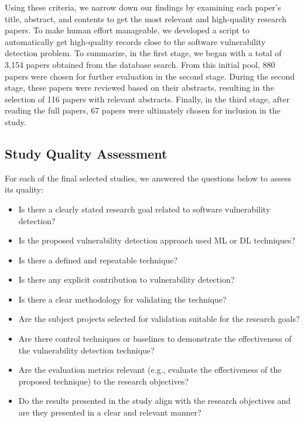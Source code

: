 {Using these criteria, we narrow down our findings by examining each paper's title, abstract, and contents to get the most relevant and high-quality research papers. To make human effort manageable, we developed a script to automatically get high-quality records close to the software vulnerability detection problem. To summarize, in the first stage, we began with a total of 3,154 papers obtained from the database search. From this initial pool, 880 papers were chosen for further evaluation in the second stage. During the second stage, these papers were reviewed based on their abstracts, resulting in the selection of 116 papers with relevant abstracts. Finally, in the third stage, after reading the full papers, 67 papers were ultimately chosen for inclusion in the study. %

\subsection{Study Quality Assessment}
\label{sec:squality}
For each of the final selected studies, we answered the questions below to assess its quality:
\begin{itemize}
\item Is there a clearly stated research goal related to software vulnerability detection? 
\item Is the proposed vulnerability detection approach used ML or DL techniques?
\item Is there a defined and repeatable technique?
\item Is there any explicit contribution to vulnerability detection?
\item Is there a clear methodology for validating the technique?
\item Are the subject projects selected for validation suitable for the research goals?
\item Are there control techniques or baselines to demonstrate the effectiveness of the vulnerability detection technique?
\item Are the evaluation metrics relevant (e.g., evaluate the effectiveness of the proposed technique) to the research objectives? 
\item Do the results presented in the study align with the research objectives and are they presented in a clear and relevant manner?
 \end{itemize}   

}
